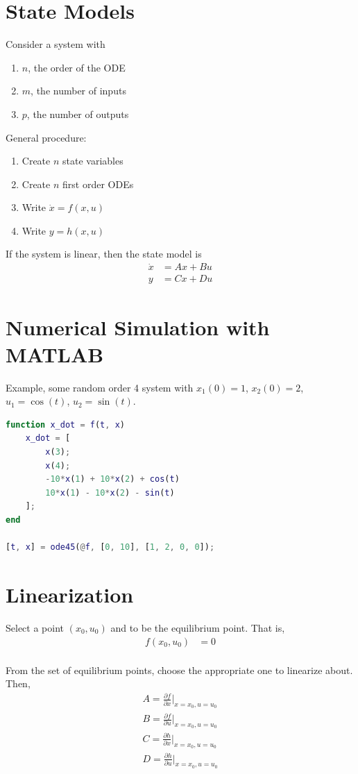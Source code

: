 \documentclass[letterpaper,12pt]{article}
\begin{document}
\section{State Models}
Consider a system with 
\begin{enumerate}
    \item $n$, the order of the ODE 
    \item $m$, the number of inputs
    \item $p$, the number of outputs
\end{enumerate}

General procedure:
\begin{enumerate}
    \item Create $n$ state variables
    \item Create $n$ first order ODEs
    \item Write $\dot{x} = f(x, u)$
    \item Write $y = h(x, u)$
\end{enumerate}

If the system is linear, then the state model is
\begin{align*}
    \dot{x} &= Ax + Bu \\
    y &= Cx + Du
\end{align*}

\section{Numerical Simulation with MATLAB}
Example, some random order 4 system with $x_{1}(0) = 1$, $x_{2}(0) = 2$,
$u_1 = \cos(t)$, $u_2 = \sin(t)$.
\begin{lstlisting}[language=Matlab]
    function x_dot = f(t, x)
    x_dot = [
        x(3);
        x(4);
        -10*x(1) + 10*x(2) + cos(t)
        10*x(1) - 10*x(2) - sin(t)
    ];
end

[t, x] = ode45(@f, [0, 10], [1, 2, 0, 0]);
\end{lstlisting}

\section{Linearization}
Select a point $(x_0, u_0)$ and to be the equilibrium point. That is,
\begin{align*}
    f(x_0, u_0) &= 0 \\
\end{align*}

From the set of equilibrium points, choose the appropriate one to linearize about.
Then,
\begin{align*}
    A = \frac{\partial f}{\partial x} \bigg|_{x=x_0, u=u_0} \\
    B = \frac{\partial f}{\partial u} \bigg|_{x=x_0, u=u_0} \\
    C = \frac{\partial h}{\partial x} \bigg|_{x=x_0, u=u_0} \\
    D = \frac{\partial h}{\partial u} \bigg|_{x=x_0, u=u_0} \\
\end{align*}
\end{document}
